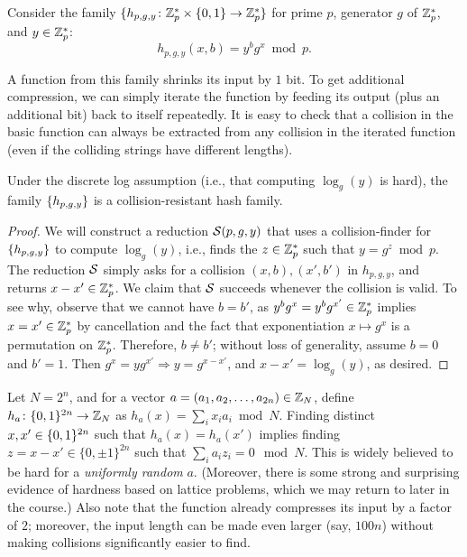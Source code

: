 \documentclass[11pt]{article}
\begin{document}
\begin{example}
  Consider the family $\{h_{p,g,y} \colon \mathbb{Z}_p^{*} \times \{0,1\} \to
    \mathbb{Z}_p^{*}\}$ for prime $p$, generator $g$ of $\mathbb{Z}_p^*$, and $y \in
  \mathbb{Z}_p^*$:
  \[h_{p,g,y}(x,b) = y^b g^x \bmod p. \]
\end{example}

A function from this family shrinks its input by $1$ bit.  To get
additional compression, we can simply iterate the function by feeding
its output (plus an additional bit) back to itself repeatedly.  It is
easy to check that a collision in the basic function can always be
extracted from any collision in the iterated function (even if the
colliding strings have different lengths).

\begin{claim}
  Under the discrete log assumption (i.e., that computing
  $\log_{g}(y)$ is hard), the family $\{h_{p,g,y}\}$ is a
  collision-resistant hash family.
\end{claim}

\begin{proof}
  We will construct a reduction $\mathcal{S}(p,g,y)$ that uses a
  collision-finder for $\{h_{p,g,y}\}$ to compute $\log_{g}(y)$,
  i.e., finds the $z \in \mathbb{Z}_p^{*}$ such that $y = g^z \bmod p$.  The
  reduction $\mathcal{S}$ simply asks for a collision $(x,b), (x',b')$ in
  $h_{p,g,y}$, and returns $x-x' \in \mathbb{Z}_p^{*}$.  We claim that $\mathcal{S}$
  succeeds whenever the collision is valid.  To see why, observe that
  we cannot have $b = b'$, as $y^b g^x = y^{b} g^{x'} \in \mathbb{Z}_p^{*}$
  implies $x = x' \in \mathbb{Z}_p^{*}$ by cancellation and the fact that
  exponentiation $x \mapsto g^{x}$ is a permutation on $\mathbb{Z}_p^{*}$.
  Therefore, $b \neq b'$; without loss of generality, assume $b = 0$
  and $b' = 1$.  Then $g^x = y g^{x'} \Rightarrow y = g^{x - x'}$, and
  $x-x' = \log_{g}(y)$, as desired.
\end{proof}

\begin{example}
  Let $N= 2^{n}$, and for a vector $a=(a_1,a_2,\ldots, a_{2n}) \in
  \mathbb{Z}_N$, define $h_a \colon \{0,1\}^{2n} \to \mathbb{Z}_N$ as $h_a(x) = \sum_i
  x_i a_i \bmod N$.  Finding distinct $x,x' \in \{0,1\}^{2n}$ such that
  $h_{a}(x) = h_{a}(x')$ implies finding $z = x-x' \in \{0, \pm 1
  \}^{2n}$ such that $\sum_i a_i z_i = 0 \mod N$.  This is widely
  believed to be hard for a \emph{uniformly random} $a$.  (Moreover,
  there is some strong and surprising evidence of hardness based on
  lattice problems, which we may return to later in the course.)  Also
  note that the function already compresses its input by a factor of
  $2$; moreover, the input length can be made even larger (say,
  $100n$) without making collisions significantly easier to find.
\end{example}
\end{document}
